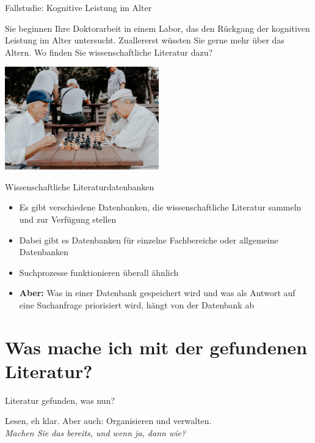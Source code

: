 \documentclass{beamer}
\begin{document}
\begin{frame}{Fallstudie: Kognitive Leistung im Alter}

Sie beginnen Ihre Doktorarbeit in einem Labor, das den Rückgang der kognitiven Leistung im Alter untersucht. Zuallererst wüssten Sie gerne mehr über das Altern. Wo finden Sie wissenschaftliche Literatur dazu?


\begin{center}
    \includegraphics[width=0.5\textwidth]{vlad-sargu-ItphH2lGzuI-unsplash.jpg}
\end{center}



\end{frame}


\begin{frame}{Wissenschaftliche Literaturdatenbanken}

\begin{itemize}
    \item 
    Es gibt verschiedene Datenbanken, die wissenschaftliche Literatur sammeln und zur Verfügung stellen
    \item 
    Dabei gibt es Datenbanken für einzelne Fachbereiche oder allgemeine Datenbanken
    \item 
    Suchprozesse funktionieren überall ähnlich
    \item 
    \textbf{Aber:} Was in einer Datenbank gespeichert wird und was als Antwort auf eine Suchanfrage priorisiert wird, hängt von der Datenbank ab
\end{itemize}
    
\end{frame}






\section{Was mache ich mit der gefundenen Literatur?}

\begin{frame}{Literatur gefunden, was nun?}

\pause

Lesen, eh klar. \pause Aber auch: Organisieren und verwalten.  \\

\emph{Machen Sie das bereits, und wenn ja, dann wie?}

    
\end{frame}
\end{document}
